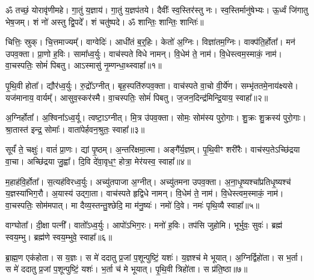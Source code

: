 \setcounter{anuvakam}{0}
ॐ तच्छं॒ योरावृ॑णीमहे। 
गा॒तुं य॒ज्ञाय॑। 
गा॒तुं य॒ज्ञप॑तये। 
दैवीः᳚ स्व॒स्तिर॑स्तु नः। 
स्व॒स्तिर्मानु॑षेभ्यः। 
ऊ॒र्ध्वं जि॑गातु भेष॒जम्। 
शं नो॑ अस्तु द्वि॒पदे᳚। 
शं चतु॑ष्पदे। 
ॐ शान्तिः॒ शान्तिः॒ शान्तिः॑॥

चित्तिः॒ स्रुक्। 
चि॒त्तमाज्यम्᳚। 
वाग्वेदिः॑। 
आधी॑तं ब॒र्॒‌हिः। 
केतो॑ अ॒ग्निः। 
विज्ञा॑तम॒ग्निः। 
वाक्प॑ति॒र्\mbox{}होता᳚। 
मन॑ उपव॒क्ता। 
प्रा॒णो ह॒विः। 
सामा᳚ध्व॒र्युः। 
वाच॑स्पते विधे नामन्। 
वि॒धेम॑ ते॒ नाम॑। 
वि॒धेस्त्वम॒स्माकं॒ नाम॑। 
वा॒चस्पतिः॒ सोमं॑ पिबतु। 
आऽस्मासु॑ नृ॒म्णन्धा॒थ्स्वाहा᳚॥१॥
\anuvakamend[अ॒ध्व॒र्युः पञ्च॑ च]

पृ॒थि॒वी होता᳚। 
द्यौर॑ध्व॒र्युः। 
रु॒द्रो᳚ऽग्नीत्। 
बृह॒स्पति॑रुपव॒क्ता। 
वाच॑स्पते वा॒चो वी॒र्ये॑ण। 
सम्भृ॑ततमे॒नाय॑क्ष्यसे। 
यज॑मानाय॒ वार्यम्᳚। 
आसुव॒स्कर॑स्मै। 
वा॒चस्पतिः॒ सोमं॑ पिबतु। 
ज॒जन॒दिन्द्र॑\-मिन्द्रि॒याय॒ स्वाहा᳚॥२॥%
\anuvakamend[पृ॒थि॒वी होता॒ दश॑]

अ॒ग्निर्\mbox{}होता᳚। 
अ॒श्विना᳚ऽध्व॒र्यू। 
त्वष्टा॒ऽग्नीत्। 
मि॒त्र उ॑पव॒क्ता। 
सोमः॒ सोम॑स्य पुरो॒गाः। 
शु॒क्रः  शु॒क्रस्य॑ पुरो॒गाः। 
श्रा॒तास्त॑ इन्द्र॒ सोमाः᳚। 
वाता॑पेर्\mbox{}हवन॒श्रुतः॒ स्वाहा᳚॥३॥%
\anuvakamend[अ॒ग्निर्होता॒ऽष्टौ]

सूर्यं॑ ते॒ चक्षुः॑। 
वातं॑ प्रा॒णः। 
द्यां पृ॒ष्ठम्। 
अ॒न्तरि॑क्षमा॒त्मा। 
अङ्गै᳚र्\mbox{}य॒ज्ञम्। 
पृ॒थि॒वीꣳ शरी॑रैः। 
वाच॑स्प॒तेऽच्छि॑द्रया वा॒चा। 
अच्छि॑द्रया जु॒ह्वा᳚। 
दि॒वि दे॑वा॒वृध॒ꣳ॒ होत्रा॒ मेर॑यस्व॒ स्वाहा᳚॥४॥%
\anuvakamend[सूर्यं॑ ते॒ नव॑]

म॒हाह॑वि॒र्\mbox{}होता᳚। 
स॒त्यह॑विरध्व॒र्युः। 
अच्यु॑तपाजा अ॒ग्नीत्। 
अच्यु॑तमना उपव॒क्ता। 
अ॒ना॒धृ॒ष्यश्चा᳚प्रतिधृ॒ष्यश्च॑ य॒ज्ञस्या॑भिग॒रौ। 
अ॒यास्य॑ उद्गा॒ता। 
वाच॑स्पते हृद्विधे नामन्। 
वि॒धेम॑ ते॒ नाम॑। 
वि॒धेस्त्वम॒स्माकं॒ नाम॑। 
वा॒चस्पतिः॒ सोम॑मपात्। 
मा दैव्य॒स्तन्तु॒श्छेदि॒ मा म॑नु॒ष्यः॑। 
नमो॑ दि॒वे। 
नमः॑ पृथि॒व्यै स्वाहा᳚॥५॥%
\anuvakamend[अ॒पा॒त्त्रीणि॑ च]

वाग्घोता᳚। 
दी॒क्षा पत्नी᳚। 
वातो᳚ऽध्व॒र्युः। 
आपो॑ऽभिग॒रः। 
मनो॑ ह॒विः। 
तप॑सि जुहोमि। 
भूर्भुवः॒ सुवः॑। 
ब्रह्म॑ स्वय॒म्भु। 
ब्रह्म॑णे स्वय॒म्भुवे॒ स्वाहा᳚॥६॥
\anuvakamend[वाग्घोता॒ नव॑]

ब्रा॒ह्म॒ण एक॑होता। 
स य॒ज्ञः। 
स मे॑ ददातु प्र॒जां प॒शून्पुष्टिं॒ यशः॑। 
य॒ज्ञश्च॑ मे भूयात्। 
अ॒ग्निर्द्विहो॑ता। 
स भ॒र्ता। 
स मे॑ ददातु प्र॒जां प॒शून्पुष्टिं॒ यशः॑। 
भ॒र्ता च॑ मे भूयात्। 
पृ॒थि॒वी त्रिहो॑ता। 
स प्र॑ति॒ष्ठा॥७॥

